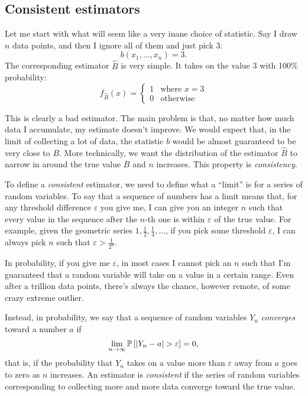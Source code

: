 \subsection{Consistent estimators}

Let me start with what will seem like a very inane choice of statistic.
Say I draw $n$ data points, and then I ignore all of them and just
pick 3:
\begin{equation}
    b(x_1, \ldots, x_n) = 3.
\end{equation}
The corresponding estimator $\hat{B}$ is very simple. It takes on the
value 3 with 100\% probability:
\begin{equation*}
    f_{\hat{B}}(x) = \begin{cases}
        1 &\text{where } x = 3 \\
        0 &\text{otherwise}
    \end{cases}
\end{equation*}

This is clearly a bad estimator. The main problem is that, no matter how much
data I accumulate, my estimate doesn't improve. We would expect that,
in the limit of
collecting a lot of data, the statistic $b$ would be almost guaranteed to be
very close to $B$. More technically, we want the distribution of the estimator
$\hat{B}$ to narrow in around the true value $B$ and $n$ increases. This
property is \emph{consistency}.

To define a \emph{consistent} estimator, we need to define what a ``limit'' is
for a series of random variables. To say that a sequence of numbers has a limit means that, for any threshold difference
$\varepsilon$ you give me, I can give you an integer $n$ such that every value
in the sequence after the $n$-th one is within $\varepsilon$ of the true value.
For example, given the geometric series $1, \tfrac{1}{2}, \tfrac{1}{4}, \ldots$,
if you pick some threshold $\varepsilon$, I can always pick $n$ such that
$\varepsilon > \tfrac{1}{2^n}$.

In probability, if you give me $\varepsilon$, in most cases I cannot pick an
$n$ such that I'm guaranteed that a random variable will take on a value in a
certain range. Even after a trillion data points, there's always the chance, however
remote, of some crazy extreme outlier.

Instead, in probability, we say that a sequence of random variables $Y_n$
\emph{converges} toward a number $a$ if
\begin{equation}
\lim_{n \to \infty} \mathbb{P}\left[{|Y_n - a| > \varepsilon}\right] = 0,
\end{equation}
that is, if the probability that $Y_n$
takes on a value more than $\varepsilon$ away from $a$ goes to zero as $n$
increases. An estimator is \emph{consistent} if the series of random variables
corresponding to collecting more and more data converge toward the true value.

